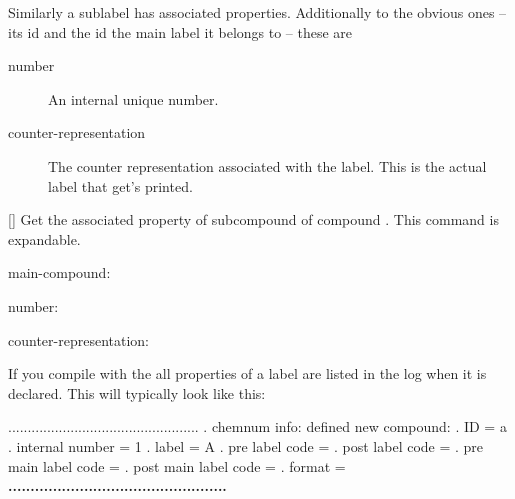 \documentclass[load-preamble+,ngerman,british,american]{cnltx-doc}
\begin{document}
Similarly a sublabel has associated properties.  Additionally to the obvious
ones -- its \ac{id} and the \ac{id} the main label it belongs to -- these
are
\begin{description}
  \item[number] An internal unique number.
  \item[counter-representation] The counter representation associated with the
    label.  This is the actual label that get's printed.
\end{description}

\begin{commands}
  \expandable{}[]
    Get the associated property  of subcompound  of compound .  This command is
    expandable.
\end{commands}

\begin{example}
  \ttfamily
  main-compound: \par
  number: \par
  counter-representation: 
\end{example}

If you compile with the  all properties of a label are
listed in the log when it is declared.  This will typically look like this:

\begin{sourcecode}
  .................................................
  . chemnum info: defined new compound:
  .   ID = a
  .   internal number = 1
  .   label = A
  .   pre label code = 
  .   post label code = 
  .   pre main label code = 
  .   post main label code = 
  .   format = \bfseries 
  .................................................
\end{sourcecode}
\end{document}
